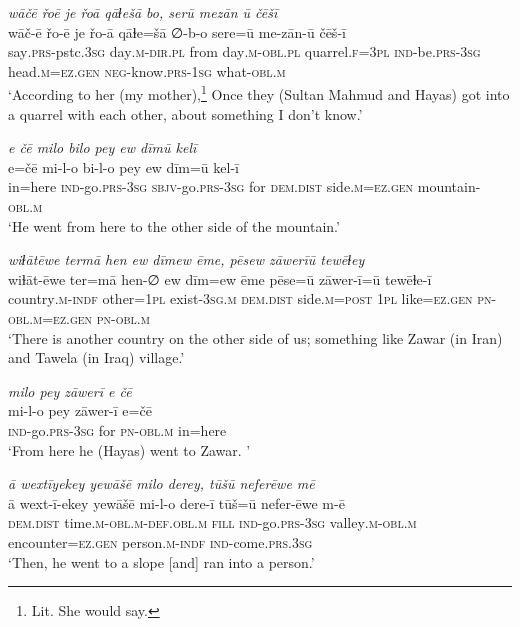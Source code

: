 \ea \label{ŽH.3}
\textit{wāčē řoē je řoā qāɫešā bo, serū mezān ū čēšī} \\ 
\gll wāč-ē řo-ē je řo-ā qāɫe=šā ∅-b-o sere=ū me-zān-ū čēš-ī \\ 
 say\textsc{.prs-}pstc\textsc{.3sg} day\textsc{.m}\textsc{-dir}\textsc{.pl} from day\textsc{.m}\textsc{-obl}\textsc{.pl} quarrel\textsc{\textsc{.f}}\textsc{=3pl} \textsc{ind-}be\textsc{.prs}\textsc{-3sg} head\textsc{.m}\textsc{=ez}\textsc{.gen} \textsc{neg-}know\textsc{.prs}\textsc{-1sg} what\textsc{-obl}\textsc{.m} \\ 
\glt `According to her (my mother),\footnote{Lit. She would say.}  Once they (Sultan Mahmud and Hayas) got into a quarrel with each other, about something I don’t know.'
\z 
 
\ea \label{ŽH.5}
\textit{e čē milo bilo pey ew dīmū kelī} \\ 
\gll e=čē mi-l-o bi-l-o pey ew dīm=ū kel-ī \\ 
 in=here \textsc{ind-}go\textsc{.prs}\textsc{-3sg} \textsc{sbjv-}go\textsc{.prs}\textsc{-3sg} for \textsc{dem.dist} side\textsc{.m}\textsc{=ez}\textsc{.gen} mountain\textsc{-obl}\textsc{.m} \\ 
\glt `He went from here to the other side of the mountain.'
\z 
 
\ea \label{ŽH.6}
\textit{wiɫātēwe termā hen ew dīmew ēme, pēsew zāwerīū tewēɫey} \\ 
\gll wiɫāt-ēwe ter=mā hen-∅ ew dīm=ew ēme pēse=ū zāwer-ī=ū tewēɫe-ī \\ 
 country\textsc{.m}\textsc{-indf} other\textsc{=1pl} exist\textsc{-3sg}\textsc{.m} \textsc{dem.dist} side\textsc{.m}\textsc{=\textsc{post}} \textsc{1pl} like\textsc{=ez}\textsc{.gen} \textsc{pn}\textsc{-obl}\textsc{.m}\textsc{=ez}\textsc{.gen} \textsc{pn}\textsc{-obl}\textsc{.m} \\ 
\glt `There is another country on the other side of us; something like Zawar (in Iran) and Tawela (in Iraq) village.'
\z 
 
\ea \label{ŽH.7}
\textit{milo pey zāwerī e čē} \\ 
\gll mi-l-o pey zāwer-ī e=čē \\ 
 \textsc{ind-}go\textsc{.prs}\textsc{-3sg} for \textsc{pn}\textsc{-obl}\textsc{.m} in=here \\ 
\glt `From here he (Hayas) went to Zawar. '
\z 
 
\ea \label{ŽH.8}
\textit{ā wextīyekey yewāšē milo derey, tūšū neferēwe mē} \\ 
\gll ā wext-ī-ekey yewāšē mi-l-o dere-ī tūš=ū nefer-ēwe m-ē \\ 
 \textsc{dem.dist} time\textsc{.m}\textsc{-obl}\textsc{.m}\textsc{-def}\textsc{.obl}\textsc{.m} \textsc{fill} \textsc{ind-}go\textsc{.prs}\textsc{-3sg} valley\textsc{.m}\textsc{-obl}\textsc{.m} encounter\textsc{=ez}\textsc{.gen} person\textsc{.m}\textsc{-indf} \textsc{ind-}come\textsc{.prs}\textsc{.3sg} \\ 
\glt `Then, he went to a slope [and] ran into a person.'
\z 
 
